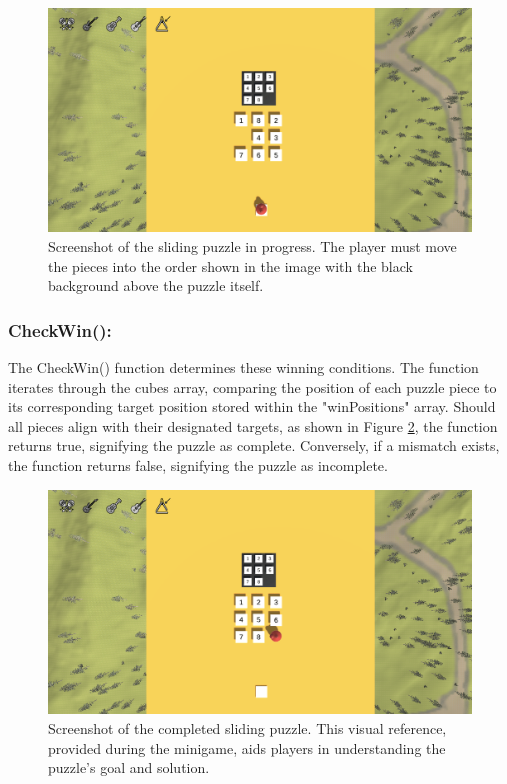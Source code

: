 \documentclass{l4proj}
\begin{document}
\begin{figure}[h]
  \centering
  \includegraphics[width=0.7\linewidth]{dissertation/images/Sliding_Incomplete.png} 
  \caption{Screenshot of the sliding puzzle in progress. The player must move the pieces into the order shown in the image with the black background above the puzzle itself.} 
  \label{fig:puzzle_incomplete} 
\end{figure}

\subsubsection{CheckWin():} The CheckWin() function determines these winning conditions. The function iterates through the cubes array, comparing the position of each puzzle piece to its corresponding target position stored within the "winPositions" array. Should all pieces align with their designated targets, as shown in Figure \ref{fig:puzzle_complete}, the function returns true, signifying the puzzle as complete. Conversely, if a mismatch exists, the function returns false, signifying the puzzle as incomplete.

\begin{figure}[h]
  \centering
  \includegraphics[width=0.7\linewidth]{dissertation/images/Sliding_Complete.png} 
  \caption{Screenshot of the completed sliding puzzle. This visual reference, provided during the minigame, aids players in understanding the puzzle's goal and solution.} 
  \label{fig:puzzle_complete} 
\end{figure}
\end{document}
